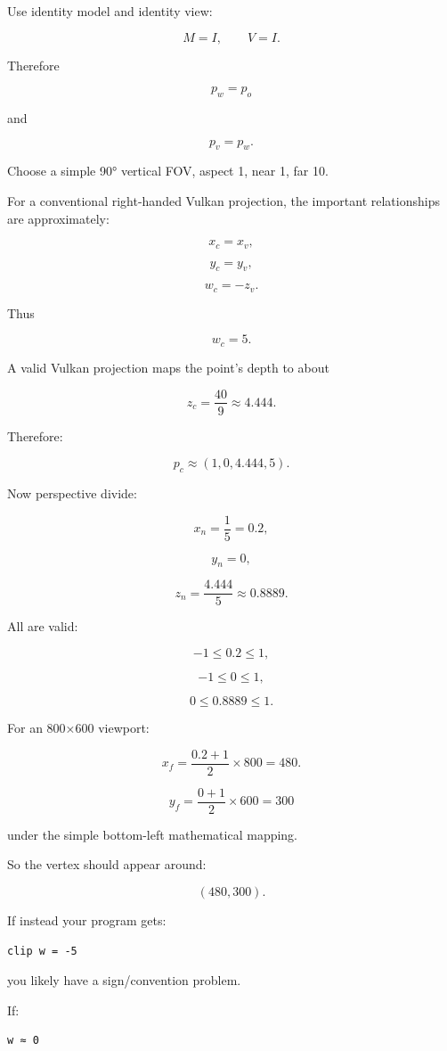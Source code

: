 Use identity model and identity view:

\[
M=I,\qquad V=I.
\]

Therefore

\[
p_w=p_o
\]

and

\[
p_v=p_w.
\]

Choose a simple 90° vertical FOV, aspect 1, near 1, far 10.

For a conventional right-handed Vulkan projection, the important relationships are approximately:

\[
x_c=x_v,
\]

\[
y_c=y_v,
\]

\[
w_c=-z_v.
\]

Thus

\[
w_c=5.
\]

A valid Vulkan projection maps the point's depth to about

\[
z_c=\frac{40}{9}\approx4.444.
\]

Therefore:

\[
p_c\approx
(1,0,4.444,5).
\]

Now perspective divide:

\[
x_n=\frac15=0.2,
\]

\[
y_n=0,
\]

\[
z_n=\frac{4.444}{5}\approx0.8889.
\]

All are valid:

\[
-1\le0.2\le1,
\]

\[
-1\le0\le1,
\]

\[
0\le0.8889\le1.
\]

For an 800×600 viewport:

\[
x_f=
\frac{0.2+1}{2}\times800
=
480.
\]

\[
y_f=
\frac{0+1}{2}\times600
=
300
\]

under the simple bottom-left mathematical mapping.

So the vertex should appear around:

\[
\boxed{(480,300)}.
\]

If instead your program gets:

\begin{verbatim}
clip w = -5
\end{verbatim}

you likely have a sign/convention problem.

If:

\begin{verbatim}
w ≈ 0
\end{verbatim}

